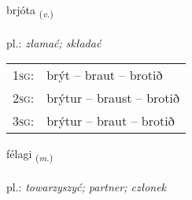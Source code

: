 \documentclass[frontgrid, backgrid]{flacards}\usepackage[]{graphicx}\usepackage[]{xcolor}
\begin{document}
\renewcommand{\flhead}{\vskip5pt \fboxsep=0pt {\small\bfseries\footnotesize Sagnorð | Verb}}
\renewcommand{\fcfoot}{\vskip5pt \fboxsep=0pt \hspace{2pt}{\small\bfseries\footnotesize 1K}}

\renewcommand{\blhead}{\vskip5pt {\small\bfseries\footnotesize Sagnorð | Verb }}
\renewcommand{\bcfoot}{\vskip5pt \hspace{2pt}{\small\bfseries\footnotesize 1K}}


{brjóta \small{\textsubscript{(\textit{v.})}} \\[1ex] %
\textphonetic{[prjouːta]} \\
pl.: \emph{złamać; składać} \\  [2ex]
\renewcommand*{\arraystretch}{0.8}
\begin{tabular}{p{1cm}l}
\textsc{1sg}: & brýt -- braut -- brotið \\ 
\textsc{2sg}: & brýtur -- braust -- brotið \\ 
\textsc{3sg}: & brýtur -- braut -- brotið \\ 
\end{tabular}
}

\renewcommand{\flhead}{\vskip5pt \fboxsep=0pt {\small\bfseries\footnotesize Nafnorð | Noun}}
\renewcommand{\fcfoot}{\vskip5pt \fboxsep=0pt \hspace{2pt}{\small\bfseries\footnotesize 1K}}

\renewcommand{\blhead}{\vskip5pt {\small\bfseries\footnotesize Nafnorð | Noun }}
\renewcommand{\bcfoot}{\vskip5pt \hspace{2pt}{\small\bfseries\footnotesize 1K}}


{félagi \small{\textsubscript{(\textit{m.})}} \\[1ex] %
\textphonetic{[fjɛːlaijɪ]} \\
pl.: \emph{towarzyszyć; partner; członek} \\  [2ex]
\renewcommand*{\arraystretch}{0.8}
}
\end{document}
